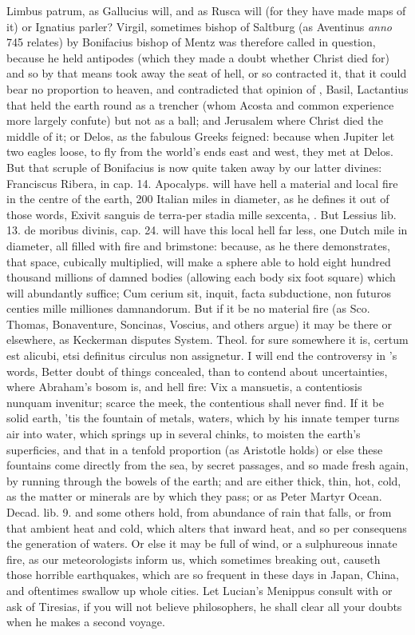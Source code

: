 {Limbus patrum, as Gallucius will, and as Rusca will (for they have made
maps of it) or Ignatius parler? Virgil, sometimes bishop of
Saltburg (as Aventinus \emph{anno} 745 relates) by Bonifacius bishop of
Mentz was therefore called in question, because he held antipodes
(which they made a doubt whether Christ died for) and so by that means
took away the seat of hell, or so contracted it, that it could bear no
proportion to heaven, and contradicted that opinion of \Austin{}, Basil,
Lactantius that held the earth round as a trencher (whom Acosta and
common experience more largely confute) but not as a ball; and
Jerusalem where Christ died the middle of it; or Delos, as the fabulous
Greeks feigned: because when Jupiter let two eagles loose, to fly from
the world's ends east and west, they met at Delos. But that scruple of
Bonifacius is now quite taken away by our latter divines: Franciscus
Ribera, in cap. 14. Apocalyps. will have hell a material and local fire
in the centre of the earth, 200 Italian miles in diameter, as he
defines it out of those words, Exivit sanguis de terra-per stadia mille
sexcenta, \etc{}. But Lessius lib. 13. de moribus divinis, cap. 24. will
have this local hell far less, one Dutch mile in diameter, all filled
with fire and brimstone: because, as he there demonstrates, that space,
cubically multiplied, will make a sphere able to hold eight hundred
thousand millions of damned bodies (allowing each body six foot square)
which will abundantly suffice; Cum cerium sit, inquit, facta
subductione, non futuros centies mille milliones damnandorum. But if it
be no material fire (as Sco. Thomas, Bonaventure, Soncinas, Voscius,
and others argue) it may be there or elsewhere, as Keckerman disputes
System. Theol. for sure somewhere it is, certum est alicubi, etsi
definitus circulus non assignetur. I will end the controversy in
\Austin{}'s words, Better doubt of things concealed, than to contend
about uncertainties, where Abraham's bosom is, and hell fire: Vix
a mansuetis, a contentiosis nunquam invenitur; scarce the meek, the
contentious shall never find. If it be solid earth, 'tis the fountain
of metals, waters, which by his innate temper turns air into water,
which springs up in several chinks, to moisten the earth's superficies,
and that in a tenfold proportion (as Aristotle holds) or else these
fountains come directly from the sea, by secret passages, and so
made fresh again, by running through the bowels of the earth; and are
either thick, thin, hot, cold, as the matter or minerals are by which
they pass; or as Peter Martyr Ocean. Decad. lib. 9. and some others
hold, from  abundance of rain that falls, or from that ambient
heat and cold, which alters that inward heat, and so per consequens the
generation of waters. Or else it may be full of wind, or a sulphureous
innate fire, as our meteorologists inform us, which sometimes breaking
out, causeth those horrible earthquakes, which are so frequent in these
days in Japan, China, and oftentimes swallow up whole cities. Let
Lucian's Menippus consult with or ask of Tiresias, if you will not
believe philosophers, he shall clear all your doubts when he makes a
second voyage.

}

